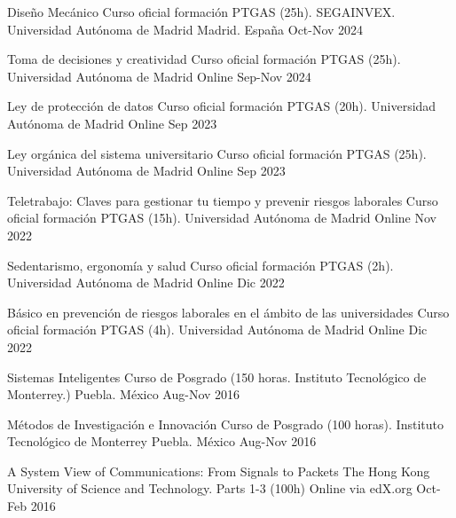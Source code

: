 \begin{cvhonors}

  \cvhonor
	{Diseño Mecánico} %
	{Curso oficial formación PTGAS (25h). SEGAINVEX. Universidad Autónoma de Madrid} %
	{Madrid. España} %
	{Oct-Nov 2024} %
    
   \cvhonor
	{Toma de decisiones y creatividad} %
	{Curso oficial formación PTGAS (25h). Universidad Autónoma de Madrid} %
	{Online} %
	{Sep-Nov 2024} %
	
   \cvhonor
	{Ley de protección de datos} %
	{Curso oficial formación PTGAS (20h). Universidad Autónoma de Madrid} %
	{Online} %
	{Sep 2023} %
	
   \cvhonor
	{Ley orgánica del sistema universitario} %
	{Curso oficial formación PTGAS (25h). Universidad Autónoma de Madrid} %
	{Online} %
	{Sep 2023} %

   \cvhonor
	{Teletrabajo: Claves para gestionar tu tiempo y prevenir riesgos laborales} %
	{Curso oficial formación PTGAS (15h). Universidad Autónoma de Madrid} %
	{Online} %
	{Nov 2022} %
	
   \cvhonor
	{Sedentarismo, ergonomía y salud} %
	{Curso oficial formación PTGAS (2h). Universidad Autónoma de Madrid} %
	{Online} %
	{Dic 2022} %

   \cvhonor
	{Básico en prevención de riesgos laborales en el ámbito de las universidades} %
	{Curso oficial formación PTGAS (4h). Universidad Autónoma de Madrid} %
	{Online} %
	{Dic 2022} %

   \cvhonor
	{Sistemas Inteligentes} %
	{Curso de Posgrado (150 horas. Instituto Tecnológico de Monterrey.)} %
	{Puebla. México} %
	{Aug-Nov 2016} %
 
   \cvhonor
	 {Métodos de Investigación e Innovación} %
	 {Curso de Posgrado (100 horas). Instituto Tecnológico de Monterrey} %
	 {Puebla. México} %
	 {Aug-Nov 2016} %

   \cvhonor
	{A System View of Communications: From Signals to Packets} %
	{The Hong Kong University of Science and Technology. Parts 1-3 (100h)}
	{Online via edX.org} %
	{Oct-Feb 2016} %
\end{cvhonors}
